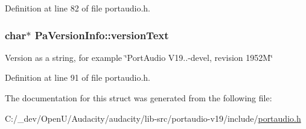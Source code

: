 Definition at line 82 of file portaudio.\+h.

\subsubsection[{\texorpdfstring{version\+Text}{versionText}}]{ char$\ast$ Pa\+Version\+Info\+::version\+Text}\hypertarget{struct_pa_version_info_ab876696c6563c35fdcb8c18f77ff12f5}{}\label{struct_pa_version_info_ab876696c6563c35fdcb8c18f77ff12f5}
Version as a string, for example \char`\"{}\+Port\+Audio V19..-\/devel, revision 1952\+M\char`\"{} 

Definition at line 91 of file portaudio.\+h.



The documentation for this struct was generated from the following file\+:\begin{DoxyCompactItemize}
\item 
C\+:/\+\_\+dev/\+Open\+U/\+Audacity/audacity/lib-\/src/portaudio-\/v19/include/\hyperlink{portaudio_8h}{portaudio.\+h}\end{DoxyCompactItemize}
